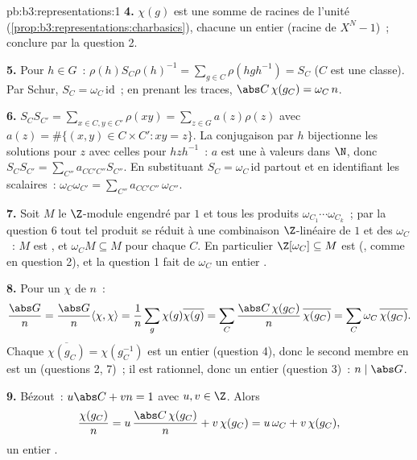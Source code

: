 \begin{solution}{pb:b3:representations:1}
\textbf{4.} $\chi(g)$ est une somme de racines de l'unité
(\cref{prop:b3:representations:charbasics}), chacune un entier
 (racine de $X^N - 1$)~; conclure par la question 2.

\textbf{5.} Pour $h \in G$~: $\rho(h)S_C\rho(h)^{-1} =
\sum_{g\in C}\rho(hgh^{-1}) = S_C$ ($C$ est une classe). Par
Schur, $S_C = \omega_C\,\mathrm{id}$~; en prenant les traces,
$\abs C\,\chi(g_C) = \omega_C\, n$.

\textbf{6.} $S_CS_{C'} = \sum_{x \in C, y \in C'}\rho(xy) =
\sum_{z \in G} a(z)\rho(z)$ avec $a(z) = \#\{(x,y) \in C\times
C' : xy = z\}$. La conjugaison par $h$ bijectionne les solutions
pour $z$ avec celles pour $hzh^{-1}$~: $a$ est une  à valeurs dans $\N$, donc $S_CS_{C'} =
\sum_{C''}a_{CC'C''}S_{C''}$. En substituant $S_C =
\omega_C\,\mathrm{id}$ partout et en identifiant les scalaires~:
$\omega_C\omega_{C'} = \sum_{C''}a_{CC'C''}\,\omega_{C''}$.

\textbf{7.} Soit $M$ le $\Z$-module engendré par $1$ et tous les
produits $\omega_{C_1}\cdots\omega_{C_k}$~; par la question 6
tout tel produit se réduit à une combinaison $\Z$-linéaire de
$1$ et des $\omega_C$~: $M$ est , et $\omega_C M
\subseteq M$ pour chaque $C$. En particulier $\Z[\omega_C]
\subseteq M$ est  (, comme en question
2), et la question 1 fait de $\omega_C$ un entier .

\textbf{8.} Pour un  $\chi$ de  $n$~:
\[
\frac{\abs G}{n} = \frac{\abs G}{n}\langle\chi,\chi\rangle
= \frac1n \sum_{g}\chi(g)\overline{\chi(g)}
= \sum_{C}\frac{\abs C\,\chi(g_C)}{n}\,\overline{\chi(g_C)}
= \sum_C \omega_C\,\overline{\chi(g_C)} .
\]
Chaque $\overline{\chi(g_C)} = \chi(g_C^{-1})$ est un entier
 (question 4), donc le second membre en est un
(questions 2, 7)~; il est rationnel, donc un entier (question
3)~: $n \mid \abs G$.

\textbf{9.} Bézout~: $u\abs C + vn = 1$ avec $u, v \in \Z$.
Alors
\[
\frac{\chi(g_C)}{n} = u\,\frac{\abs C\,\chi(g_C)}{n} +
v\,\chi(g_C) = u\,\omega_C + v\,\chi(g_C),
\]
un entier .


\end{solution}
